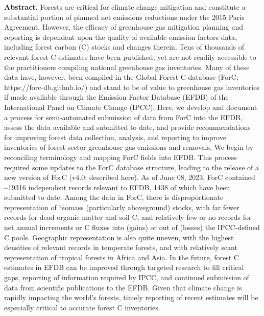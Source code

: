\documentclass[, manuscript]{copernicus}
\begin{document}
\textbf{Abstract.} Forests are critical for climate change mitigation
and constitute a substantial portion of planned net emissions reductions
under the 2015 Paris Agreement. However, the efficacy of greenhouse gas
mitigation planning and reporting is dependent upon the quality of
available emission factors data, including forest carbon (C) stocks and
changes therein. Tens of thousands of relevant forest C estimates have
been published, yet are not readily accessible to the practitioners
compiling national greenhouse gas inventories. Many of these data have,
however, been compiled in the Global Forest C database (ForC;
https://forc-db.github.io/) and stand to be of value to greenhouse gas
inventories if made available through the Emission Factor Database
(EFDB) of the International Panel on Climate Change (IPCC). Here, we
develop and document a process for semi-automated submission of data
from ForC into the EFDB, assess the data available and submitted to
date, and provide recommendations for improving forest data collection,
analysis, and reporting to improve inventories of forest-sector
greenhouse gas emissions and removals. We begin by reconciling
terminology and mapping ForC fields into EFDB. This process required
some updates to the ForC database structure, leading to the release of a
new version of ForC (v4.0; described here). As of June 08, 2023, ForC
contained \textasciitilde19316 independent records relevant to EFDB,
1438 of which have been submitted to date. Among the data in ForC, there
is disproportionate representation of biomass (particularly aboveground)
stocks, with far fewer records for dead organic matter and soil C, and
relatively few or no records for net annual increments or C fluxes into
(gains) or out of (losses) the IPCC-defined C pools. Geographic
representation is also quite uneven, with the highest densities of
relevant records in temperate forests, and with relatively scant
representation of tropical forests in Africa and Asia. In the future,
forest C estimates in EFDB can be improved through targeted research to
fill critical gaps, reporting of information required by IPCC, and
continued submission of data from scientific publications to the EFDB.
Given that climate change is rapidly impacting the world's forests,
timely reporting of recent estimates will be especially critical to
accurate forest C inventories.

\introduction[Introduction]
\end{document}
